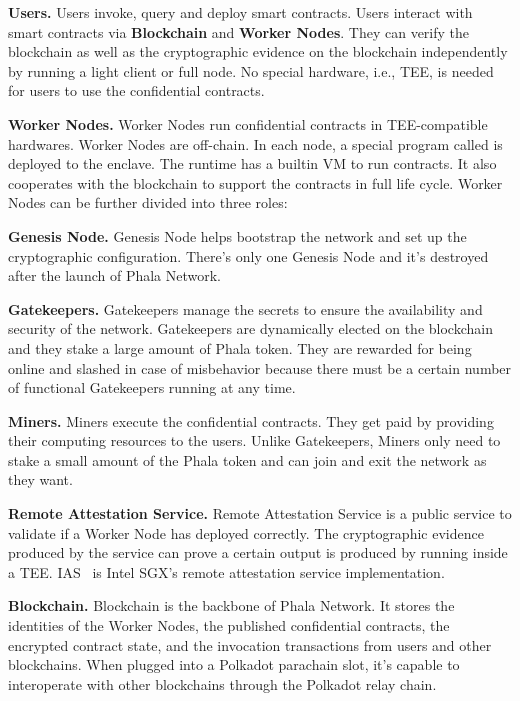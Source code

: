 \begin{icompact}
    \item \textbf{Users.}
    Users invoke, query and deploy smart contracts. Users interact with smart contracts via \textbf{Blockchain} and \textbf{Worker Nodes}. They can verify the blockchain as well as the cryptographic evidence on the blockchain independently by running a light client or full node. No special hardware, i.e., TEE, is needed for users to use the confidential contracts.
    \item \textbf{Worker Nodes.}
    Worker Nodes run confidential contracts in TEE-compatible hardwares. Worker Nodes are off-chain. In each node, a special program called \pruntime is deployed to the enclave. The runtime has a builtin VM to run contracts. It also cooperates with the blockchain to support the contracts in full life cycle. Worker Nodes can be further divided into three roles:
    \begin{icompact}
        \item \textbf{Genesis Node.}
        Genesis Node helps bootstrap the network and set up the cryptographic configuration. There's only one Genesis Node and it's destroyed after the launch of Phala Network.
        \item \textbf{Gatekeepers.}
        Gatekeepers manage the secrets to ensure the availability and security of the network. Gatekeepers are dynamically elected on the blockchain and they stake a large amount of Phala token. They are rewarded for being online and slashed in case of misbehavior because there must be a certain number of functional Gatekeepers running at any time.
        \item \textbf{Miners.}
        Miners execute the confidential contracts. They get paid by providing their computing resources to the users. Unlike Gatekeepers, Miners only need to stake a small amount of the Phala token and can join and exit the network as they want.
    \end{icompact}
    \item \textbf{Remote Attestation Service.}
    Remote Attestation Service is a public service to validate if a Worker Node has deployed \pruntime correctly. The cryptographic evidence produced by the service can prove a certain output is produced by \pruntime running inside a TEE. IAS~\cite{ias} is Intel SGX's remote attestation service implementation.
    \item \textbf{Blockchain.}
    Blockchain is the backbone of Phala Network. It stores the identities of the Worker Nodes, the published confidential contracts, the encrypted contract state, and the invocation transactions from users and other blockchains. When plugged into a Polkadot parachain slot, it's capable to interoperate with other blockchains through the Polkadot relay chain.
\end{icompact}



